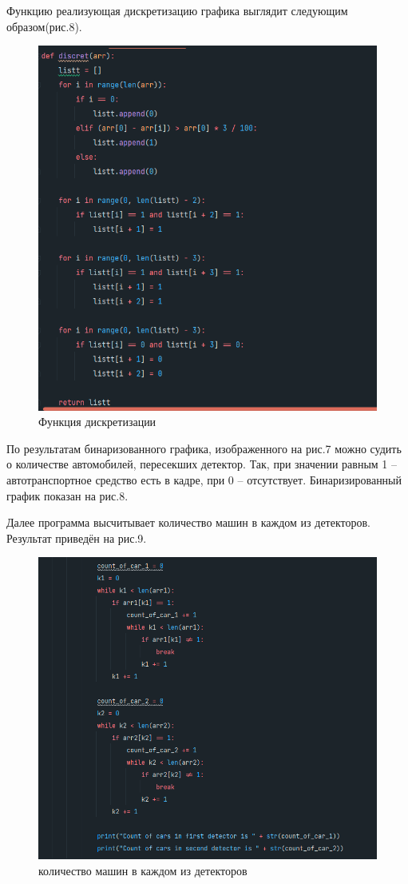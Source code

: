 \documentclass[a4paper,12pt]{article}
\begin{document}
Функцию реализующая дискретизацию графика выглядит следующим образом(рис.8).

\begin{figure}[h!]
  \begin{center}
      \includegraphics[width=0.8\linewidth]{bin_func}
      \caption{Функция дискретизации} 
      \label{} 
  \end{center} 
\end{figure}

\newpage

По результатам бинаризованного графика, изображенного на рис.7 можно судить о количестве автомобилей, пересекших детектор. Так, при значении равным 1 – автотранспортное средство есть в кадре, при 0 – отсутствует.
Бинаризированный график показан на рис.8.

Далее программа высчитывает количество машин в каждом из детекторов. Результат приведён на рис.9.

\begin{figure}[h!]
  \begin{center}
      \includegraphics[width=0.8\linewidth]{car_count}
      \caption{количество машин в каждом из детекторов} 
      \label{} 
  \end{center} 
\end{figure}
\end{document}
